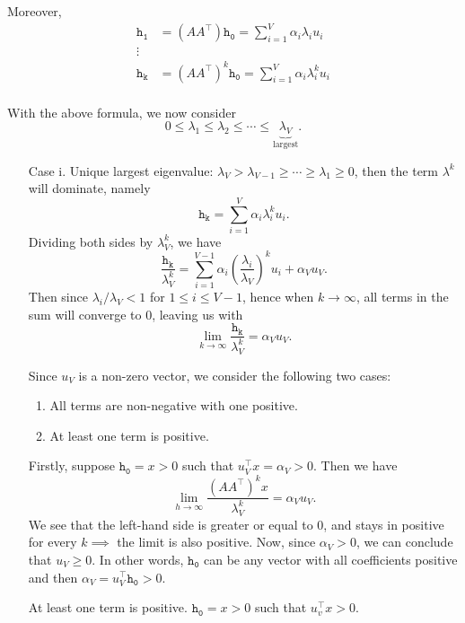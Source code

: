 Moreover,
\[
	\begin{split}
		\mathtt{h_1} &= (A A^{\top})\mathtt{h_0} = \sum\limits_{i=1}^{V} \alpha_{i} \lambda_{i}u_{i}\\
		\vdots\\
		\mathtt{h_k} &= (A A^{\top})^k\mathtt{h_0} = \sum\limits_{i=1}^{V} \alpha_{i} \lambda_{i}^k u_{i}\\
	\end{split}
\]

With the above formula, we now consider
\[
	0 \leq \lambda_1 \leq \lambda_2 \leq \cdots \leq \underbrace{\lambda_V}_{\text{largest}}.
\]
\begin{enumerate}
	\item[Case i.] Unique largest eigenvalue: \(\lambda_V > \lambda_{V-1} \geq \cdots \geq \lambda_{1}\geq 0\), then the term \(\lambda^k\)
		will dominate, namely
		\[
			\mathtt{h_k} = \sum\limits_{i=1}^{V} \alpha_{i}\lambda_{i}^k u_{i}.
		\]
		Dividing both sides by \(\lambda_{V}^k\), we have
		\[
			\frac{\mathtt{h_{k}}}{\lambda_{V}^k} = \sum\limits_{i=1}^{V - 1}\alpha_{i}\left(\frac{\lambda_{i}}{\lambda_{V}}\right)^k u_{i} + \alpha_{V}u_{V}.
		\]
		Then since \(\lambda_{i}/\lambda_{V}< 1\) for \(1\leq i\leq V-1\), hence when \(k\to \infty \), all terms in the sum will converge to \(0\), leaving us with
		\[
			\lim_{k \to \infty} \frac{\mathtt{h_k}}{\lambda_V^k}= \alpha_V u_V.
		\]

		Since \(u_V\) is a non-zero vector, we consider the following two cases:
		\begin{enumerate}
			\item All terms are non-negative with one positive.
			\item At least one term is positive.
		\end{enumerate}
		Firstly, suppose \(\mathtt{h_0}= x>0\) such that \(u_{V}^{\top}x = \alpha_{V} >0\). Then we have
		\[
			\lim\limits_{h \to \infty} \frac{\left(A A^{\top}\right)^k x}{\lambda_{V}^k} = \alpha_{V}u_{V}.
		\]
		We see that the left-hand side is greater or equal to \(0\), and stays in positive for every \(k\implies \) the limit is also positive. Now, since \(\alpha_{V}>0\),
		we can conclude that \(u_{V}\geq 0\). In other words, \(\mathtt{h_0}\) can be any vector with all coefficients positive and then \(\alpha_{V} = u^{\top}_{V}\mathtt{h_0}>0\).

		At least one term is positive. \(\mathtt{h_0} = x > 0\) such that \(u_{v}^{\top}x>0\).


\end{enumerate}
